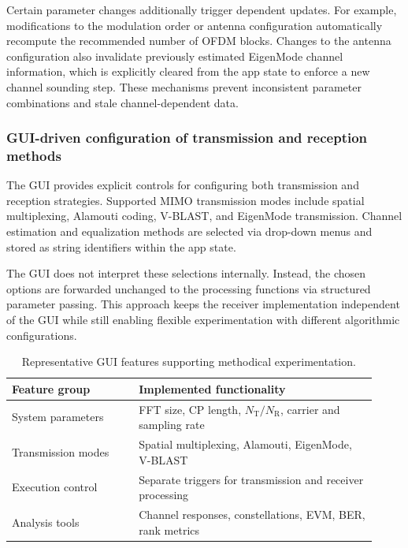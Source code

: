 Certain parameter changes additionally trigger dependent updates. For example, modifications to the modulation order or antenna configuration automatically recompute the recommended number of OFDM blocks. Changes to the antenna configuration also invalidate previously estimated EigenMode channel information, which is explicitly cleared from the app state to enforce a new channel sounding step. These mechanisms prevent inconsistent parameter combinations and stale channel-dependent data.

\subsubsection{GUI-driven configuration of transmission and reception methods}
\label{sec:gui_method_selection}

The GUI provides explicit controls for configuring both transmission and reception strategies. Supported MIMO transmission modes include spatial multiplexing, Alamouti coding, V-BLAST, and EigenMode transmission. Channel estimation and equalization methods are selected via drop-down menus and stored as string identifiers within the app state.

The GUI does not interpret these selections internally. Instead, the chosen options are forwarded unchanged to the processing functions via structured parameter passing. This approach keeps the receiver implementation independent of the GUI while still enabling flexible experimentation with different algorithmic configurations.

\begin{table}[t]
\centering
\caption{Representative GUI features supporting methodical experimentation.}
\label{tab:gui_features}
\begin{tabular}{p{0.32\linewidth}p{0.60\linewidth}}
\hline
Feature group & Implemented functionality \\
\hline
System parameters & FFT size, CP length, $N_{\mathrm{T}}/N_{\mathrm{R}}$, carrier and sampling rate \\
Transmission modes & Spatial multiplexing, Alamouti, EigenMode, V-BLAST \\
Execution control & Separate triggers for transmission and receiver processing \\
Analysis tools & Channel responses, constellations, EVM, BER, rank metrics \\
\hline
\end{tabular}
\end{table}

